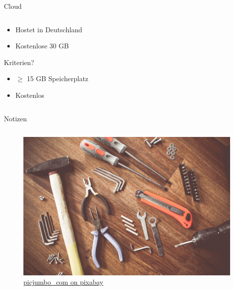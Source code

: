 \begin{frame}[t]{Cloud}
\begin{columns}[t]
\begin{column}{0.7\textwidth}
\begin{itemize}[]
\begin{itemize}
                    \item Hostet in Deutschland
                    \item Kostenlose 30 GB
                \end{itemize}
            \end{itemize}
            Kriterien?
            \begin{itemize}[]
                \item $\geq$ 15 GB Speicherplatz
                \item Kostenlos
            \end{itemize}
        \end{column}        
    \end{columns}
\end{frame}

\begin{frame}[t]{Notizen}
    \begin{columns}[t]
        \begin{column}{0.29\textwidth}      
            \vspace{-3em} 
            \begin{figure}[t]
                \begin{flushleft}
                    \includegraphics[height=0.8\textheight,trim={0 0 25cm 0},clip]{graphics/tools-864983_1280.jpg}         
                    \caption*{\href{https://pixabay.com/de/photos/werkzeuge-konstruieren-boot-864983/}{picjumbo\_com on pixabay}}    
                \end{flushleft}                
                      

\end{figure}
\end{column}
\end{columns}
\end{frame}
